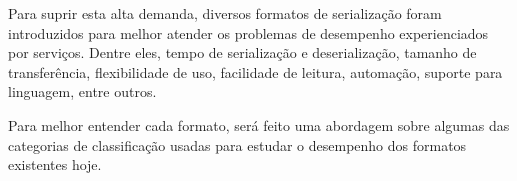 Para suprir esta alta demanda, diversos formatos de serialização foram introduzidos para melhor atender os problemas de desempenho experienciados por serviços. Dentre eles, tempo de serialização e deserialização, tamanho de transferência, flexibilidade de uso, facilidade de leitura, automação, suporte para linguagem, entre outros. \cite{Guller2016}

\begin{table}[ht!]
  \centering
  \caption{Comparação de formatos de serialização}
\end{table}

Para melhor entender cada formato, será feito uma abordagem sobre algumas das categorias de classificação usadas para estudar o desempenho dos formatos existentes hoje.





